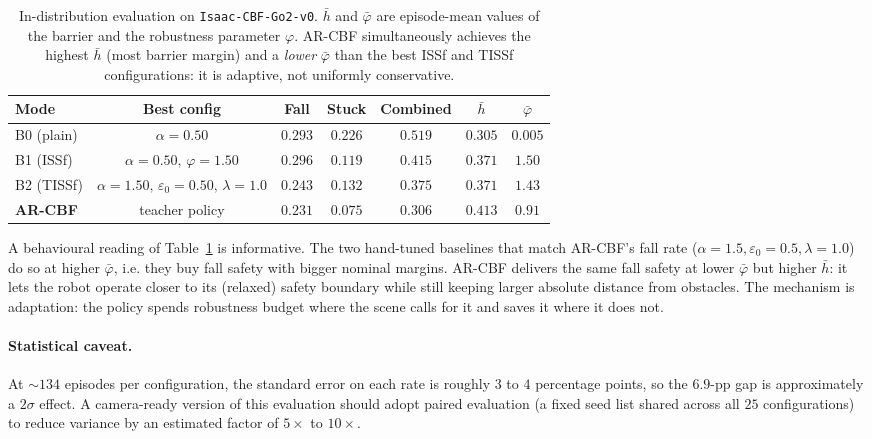 \documentclass{article}
\newcommand{\methodname}{\textsc{AR-CBF}}  %
\begin{document}
\begin{table}[H]
\centering
\small
\begin{tabular}{lcccccc}
\toprule
Mode & Best config & Fall & Stuck & Combined & $\bar h$ & $\bar\varphi$ \\
\midrule
B0 (plain)  & $\alpha=0.50$ & $0.293$ & $0.226$ & $0.519$ & $0.305$ & $0.005$ \\
B1 (ISSf)   & $\alpha=0.50,\,\varphi=1.50$ & $0.296$ & $0.119$ & $0.415$ & $0.371$ & $1.50$ \\
B2 (TISSf)  & $\alpha=1.50,\,\varepsilon_0=0.50,\,\lambda=1.0$ & $0.243$ & $0.132$ & $0.375$ & $0.371$ & $1.43$ \\
\textbf{\methodname{}} & teacher policy & $\mathbf{0.231}$ & $\mathbf{0.075}$ & $\mathbf{0.306}$ & $0.413$ & $0.91$ \\
\bottomrule
\end{tabular}
\caption{In-distribution evaluation on \texttt{Isaac-CBF-Go2-v0}. $\bar h$ and
$\bar\varphi$ are episode-mean values of the barrier and the robustness
parameter $\varphi$. \methodname{} simultaneously achieves the highest
$\bar h$ (most barrier margin) and a \emph{lower} $\bar\varphi$ than the best
ISSf and TISSf configurations: it is adaptive, not uniformly conservative.}
\label{tab:in-dist}
\end{table}

A behavioural reading of Table~\ref{tab:in-dist} is informative. The two
hand-tuned baselines that match \methodname{}'s fall rate
($\alpha=1.5,\varepsilon_0=0.5,\lambda=1.0$) do so at higher $\bar\varphi$,
i.e. they buy fall safety with bigger nominal margins. \methodname{} delivers
the same fall safety at lower $\bar\varphi$ but higher $\bar h$: it lets
the robot operate closer to its (relaxed) safety boundary while still keeping
larger absolute distance from obstacles. The mechanism is adaptation: the
policy spends robustness budget where the scene calls for it and saves it
where it does not.

\paragraph{Statistical caveat.} At $\sim 134$ episodes per configuration,
the standard error on each rate is roughly $3$ to $4$ percentage points, so the
$6.9$-pp gap is approximately a $2\sigma$ effect. A camera-ready version of
this evaluation should adopt paired evaluation (a fixed seed list shared
across all $25$ configurations) to reduce variance by an estimated factor of
$5\times$ to $10\times$.
\end{document}
